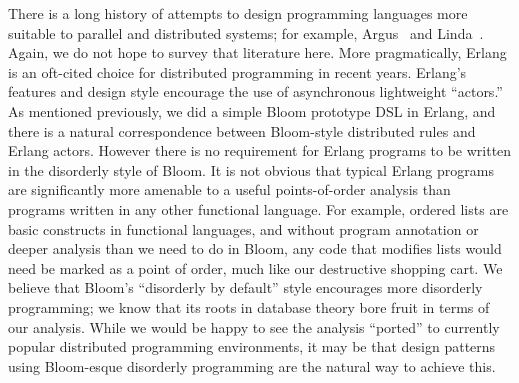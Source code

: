 There is a long history of attempts to design programming languages more
suitable to parallel and distributed systems; for example, Argus~\cite{argus}
and Linda~\cite{linda}.  Again, we do not hope to survey that literature here.
More pragmatically, Erlang is an oft-cited choice for distributed programming in
recent years.  Erlang's features and design style encourage the use of
asynchronous lightweight ``actors.''  As mentioned previously, we did a simple
Bloom prototype DSL in Erlang, and there is a natural correspondence between
Bloom-style distributed rules and Erlang actors.  However there is no
requirement for Erlang programs to be written in the disorderly style of
Bloom. It is not obvious that typical Erlang programs are significantly more
amenable to a useful points-of-order analysis than programs written in any other
functional language.  For example, ordered lists are basic constructs in
functional languages, and without program annotation or deeper analysis than we
need to do in Bloom, any code that modifies lists would need be marked as a
point of order, much like our destructive shopping cart.  We believe that
Bloom's ``disorderly by default'' style encourages more disorderly programming;
we know that its roots in database theory bore fruit in terms of our analysis.
While we would be happy to see the analysis ``ported'' to currently popular
distributed programming environments, it may be that design patterns using
Bloom-esque disorderly programming are the natural way to achieve this.
